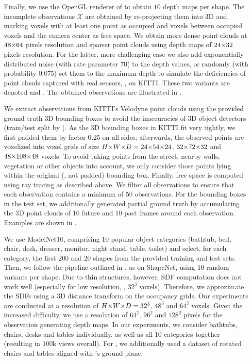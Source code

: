 Finally, we use the OpenGL renderer of \cite{Guney2015CVPR} to obtain $10$ depth maps per shape. The incomplete observations $\mathcal{X}$ are obtained by re-projecting them into 3D and marking voxels with at least one point as occupied and voxels between occupied voxels and the camera center as free space. We obtain more dense point clouds at $48 \operatorname*{\!\times\!} 64$ pixels resolution and sparser point clouds using depth maps of $24 \operatorname*{\!\times\!} 32$ pixels resolution. For the latter, more challenging case we also add exponentially distributed noise (with rate parameter $70$) to the depth values, or randomly (with probability $0.075$) set them to the maximum depth to simulate the deficiencies of point clouds captured with real sensors, \eg, on KITTI. These two variants are denoted {\bf\clean} and {\bf\noisy}.
The obtained observations are illustrated in .



%
We extract observations from KITTI's Velodyne point clouds using the provided ground truth 3D bounding boxes to avoid the inaccuracies of 3D object detectors (train/test split by \cite{Chen2016ARXIV}). As the 3D bounding boxes in KITTI fit very tightly, we first padded them by factor $0.25$ on all sides; afterwards, the observed points are voxelized into voxel grids of size $H \ntimes W \ntimes D = 24 \ntimes 54 \ntimes 24$, $32 \operatorname*{\!\times\!} 72 \operatorname*{\!\times\!} 32$ and $48 \operatorname*{\!\times\!} 108 \operatorname*{\!\times\!} 48$ voxels. To avoid taking points from the street, nearby walls, vegetation or other objects into account, we only consider those points lying within the original (\ie, not padded) bounding box. Finally, free space is computed using ray tracing as described above. We filter all observations to ensure that each observation contains a minimum of $50$ observations. For the bounding boxes in the test set, we additionally generated partial ground truth by accumulating the 3D point clouds of $10$ future and $10$ past frames around each observation. Examples are shown in .

%
We use ModelNet10, comprising $10$ popular object categories (bathtub, bed, chair, desk, dresser, monitor, night stand, table, toilet) and select, for each category, the first $200$ and $20$ shapes from the provided training and test sets. Then, we follow the pipeline outlined in , as on ShapeNet, using $10$ random variants per shape. Due to thin structures, however, SDF computation does not work well (especially for low resolution, \eg, $32^3$ voxels). Therefore, we approximate the SDFs using a 3D distance transform on the occupancy grids. Our experiments are conducted at a resolution of $H \operatorname*{\!\times\!} W \operatorname*{\!\times\!} D = 32^3$, $48^3$ and $64^3$ voxels. Given the increased difficulty, we use a resolution of $64^2$, $96^2$ and $128^2$ pixels for the observation generating depth maps. In our experiments, we consider bathtubs, chairs, desks and tables individually, as well as all $10$ categories together (resulting in $100\text{k}$ views overall). For \Kinect, we additionally used a dataset of rotated chairs and tables aligned with \Kinect's ground plane.

